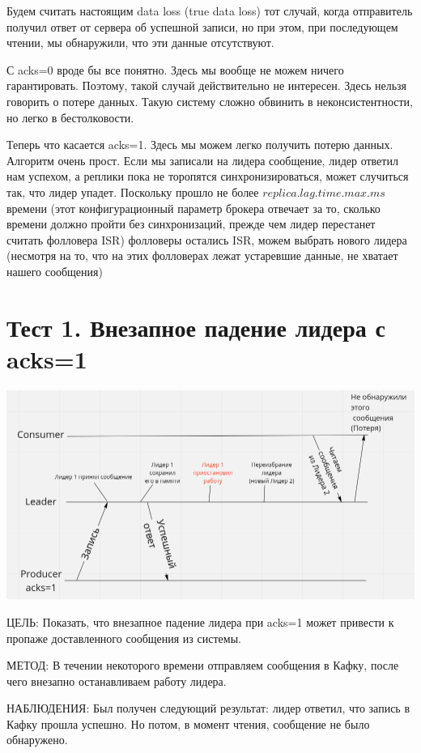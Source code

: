 \documentclass[11pt]{article}
\begin{document}
    Будем считать настоящим data loss (true data loss) тот случай, когда отправитель получил ответ от сервера об
    успешной записи, но при этом, при последующем чтении, мы обнаружили, что эти данные отсутствуют.

    С acks=0 вроде бы все понятно. Здесь мы вообще не можем ничего гарантировать. Поэтому, такой случай действительно
    не интересен. Здесь нельзя говорить о потере данных. Такую систему сложно обвинить в неконсистентности, но легко в бестолковости.

    Теперь что касается acks=1. Здесь мы можем легко получить потерю данных. Алгоритм очень прост. Если мы записали на
    лидера сообщение, лидер ответил нам успехом, а реплики пока не торопятся синхронизироваться, может случиться так,
    что лидер упадет. Поскольку прошло не более $replica.lag.time.max.ms$ времени (этот конфигурационный параметр
    брокера отвечает за то, сколько времени должно пройти без синхронизаций, прежде чем лидер перестанет считать
    фолловера ISR) фолловеры остались ISR, можем выбрать нового лидера (несмотря на то, что на этих фолловерах лежат
    устаревшие данные, не хватает нашего сообщения)

    \section*{Тест 1. Внезапное падение лидера с acks=1}

    \includegraphics[width=15cm]{test1diag}

    ЦЕЛЬ: Показать, что внезапное падение лидера при acks=1 может привести к пропаже доставленного сообщения из системы.

    МЕТОД: В течении некоторого времени отправляем сообщения в Кафку, после чего внезапно останавливаем работу лидера.

    НАБЛЮДЕНИЯ: Был получен следующий результат: лидер ответил, что запись в Кафку прошла
    успешно. Но потом, в момент чтения, сообщение не было обнаружено.
\end{document}
